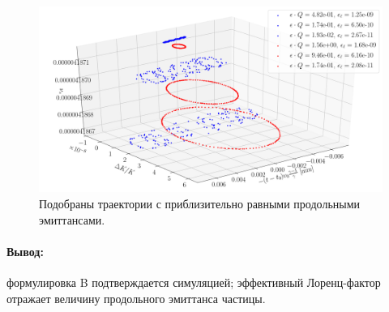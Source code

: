 \begin{figure}[h]
  \centering
  \includegraphics[height=.3\paperheight]{images/stune_traj_equ/part2/3D_plot_all_ps_vars_equal_long_emi}
  \caption{Подобраны траектории с приблизительно равными продольными эмиттансами.\label{fig:gamma_eff}}
\end{figure}

\paragraph{Вывод:} формулировка B подтверждается симуляцией; эффективный Лоренц-фактор отражает величину продольного эмиттанса частицы.
